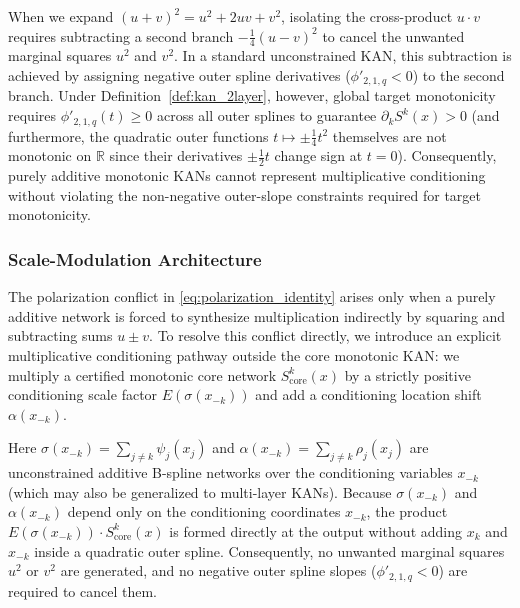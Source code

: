\documentclass[11pt,a4paper]{article}
\theoremstyle{plain}
\theoremstyle{definition}
\theoremstyle{remark}
\begin{document}
When we expand $(u + v)^2 = u^2 + 2uv + v^2$, isolating the cross-product $u \cdot v$ requires subtracting a second branch $-\frac{1}{4}(u - v)^2$ to cancel the unwanted marginal squares $u^2$ and $v^2$. In a standard unconstrained KAN, this subtraction is achieved by assigning negative outer spline derivatives ($\phi'_{2, 1, q} < 0$) to the second branch. Under Definition~\ref{def:kan_2layer}, however, global target monotonicity requires $\phi'_{2, 1, q}(t) \ge 0$ across all outer splines to guarantee $\partial_k S^k(x) > 0$ (and furthermore, the quadratic outer functions $t \mapsto \pm \frac{1}{4}t^2$ themselves are not monotonic on $\mathbb{R}$ since their derivatives $\pm \frac{1}{2}t$ change sign at $t = 0$). Consequently, purely additive monotonic KANs cannot represent multiplicative conditioning without violating the non-negative outer-slope constraints required for target monotonicity.

\subsubsection{Scale-Modulation Architecture}
The polarization conflict in \eqref{eq:polarization_identity} arises only when a purely additive network is forced to synthesize multiplication indirectly by squaring and subtracting sums $u \pm v$. To resolve this conflict directly, we introduce an explicit multiplicative conditioning pathway outside the core monotonic KAN: we multiply a certified monotonic core network $S^k_{\text{core}}(x)$ by a strictly positive conditioning scale factor $E(\sigma(x_{-k}))$ and add a conditioning location shift $\alpha(x_{-k})$.

Here $\sigma(x_{-k}) = \sum_{j \neq k} \psi_j(x_j)$ and $\alpha(x_{-k}) = \sum_{j \neq k} \rho_j(x_j)$ are unconstrained additive B-spline networks over the conditioning variables $x_{-k}$ (which may also be generalized to multi-layer KANs). Because $\sigma(x_{-k})$ and $\alpha(x_{-k})$ depend only on the conditioning coordinates $x_{-k}$, the product $E(\sigma(x_{-k})) \cdot S^k_{\text{core}}(x)$ is formed directly at the output without adding $x_k$ and $x_{-k}$ inside a quadratic outer spline. Consequently, no unwanted marginal squares $u^2$ or $v^2$ are generated, and no negative outer spline slopes ($\phi'_{2, 1, q} < 0$) are required to cancel them.
\end{document}
